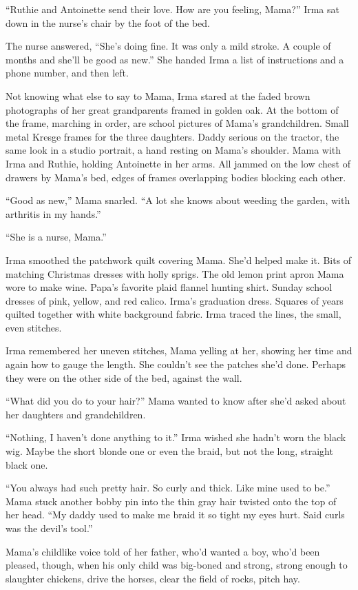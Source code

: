 \documentclass[
]{article}
\begin{document}
``Ruthie and Antoinette send their love. How are you feeling, Mama?''
Irma sat down in the nurse's chair by the foot of the bed.

The nurse answered, ``She's doing fine. It was only a mild stroke. A
couple of months and she'll be good as new.'' She handed Irma a list of
instructions and a phone number, and then left.

Not knowing what else to say to Mama, Irma stared at the faded brown
photographs of her great grandparents framed in golden oak. At the
bottom of the frame, marching in order, are school pictures of Mama's
grandchildren. Small metal Kresge frames for the three daughters. Daddy
serious on the tractor, the same look in a studio portrait, a hand
resting on Mama's shoulder. Mama with Irma and Ruthie, holding
Antoinette in her arms. All jammed on the low chest of drawers by Mama's
bed, edges of frames overlapping bodies blocking each other.

``Good as new,'' Mama snarled. ``A lot she knows about weeding the
garden, with arthritis in my hands.''

``She is a nurse, Mama.''

Irma smoothed the patchwork quilt covering Mama. She'd helped make it.
Bits of matching Christmas dresses with holly sprigs. The old lemon
print apron Mama wore to make wine. Papa's favorite plaid flannel
hunting shirt. Sunday school dresses of pink, yellow, and red calico.
Irma's gradu­ation dress. Squares of years quilted together with white
background fabric. Irma traced the lines, the small, even stitches.

Irma remembered her uneven stitches, Mama yelling at her, showing her
time and again how to gauge the length. She couldn't see the patches
she'd done. Perhaps they were on the other side of the bed, against the
wall.

``What did you do to your hair?'' Mama wanted to know after she'd asked
about her daughters and grandchildren.

``Nothing, I haven't done anything to it.'' Irma wished she hadn't worn
the black wig. Maybe the short blonde one or even the braid, but not the
long, straight black one.

``You always had such pretty hair. So curly and thick. Like mine used to
be.'' Mama stuck another bobby pin into the thin gray hair twisted onto
the top of her head. ``My daddy used to make me braid it so tight my
eyes hurt. Said curls was the devil's tool.''

Mama's childlike voice told of her father, who'd wanted a boy, who'd
been pleased, though, when his only child was big-boned and strong,
strong enough to slaughter chickens, drive the horses, clear the field
of rocks, pitch hay.
\end{document}

